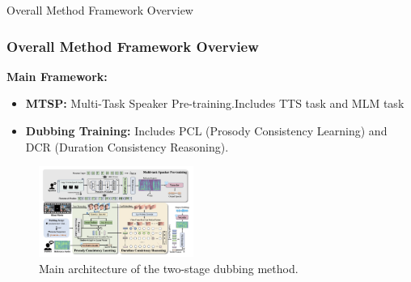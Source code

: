 
\begin{frame}{Overall Method Framework Overview}
    \frametitle{Overall Method Framework Overview}
    \textbf{Main Framework:}
    \begin{itemize}
        \item \textbf{MTSP:} Multi-Task Speaker Pre-training.Includes TTS task and MLM task
        \item \textbf{Dubbing Training:} Includes PCL (Prosody Consistency Learning) and DCR (Duration Consistency Reasoning).
    \end{itemize}
    \begin{figure}
        \centering
        \includegraphics[width=0.45\textwidth]{figs/The main architecture.png}
        \caption{Main architecture of the two-stage dubbing method.}
        \label{fig:method-framework}
    \end{figure}
\end{frame}


